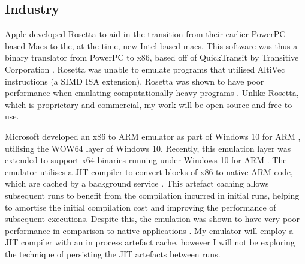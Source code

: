 \subsection{Industry}

Apple developed Rosetta \cite{apple-rosetta} to aid in the transition from their earlier PowerPC based Macs to the, at the time, new Intel based macs. This software was thus a binary translator from PowerPC to x86, based off of QuickTransit by Transitive Corporation \cite{cnet-rosetta}. Rosetta was unable to emulate programs that utilised AltiVec instructions (a SIMD ISA extension). Rosetta was shown to have poor performance when emulating computationally heavy programs \cite{rosetta-perf}. Unlike Rosetta, which is proprietary and commercial, my work will be open source and free to use.

Microsoft developed an x86 to ARM emulator as part of Windows 10 for ARM \cite{docs-win10-arm-emu}, utilising the WOW64 \cite{WOW64} layer of Windows 10. Recently, this emulation layer was extended to support x64 binaries running under Windows 10 for ARM \cite{win10-arm-x64-emu}. The emulator utilises a JIT compiler to convert blocks of x86 to native ARM code, which are cached by a background service \cite{docs-win10-arm-emu, blackberry-win10-arm-emu}. This artefact caching allows subsequent runs to benefit from the compilation incurred in initial runs, helping to amortise the initial compilation cost and improving the performance of subsequent executions. Despite this, the emulation was shown to have very poor performance in comparison to native applications \cite{win10-arm-x64-emu-perf1, win10-arm-x64-emu-perf2}. My emulator will employ a JIT compiler with an in process artefact cache, however I will not be exploring the technique of persisting the JIT artefacts between runs.

